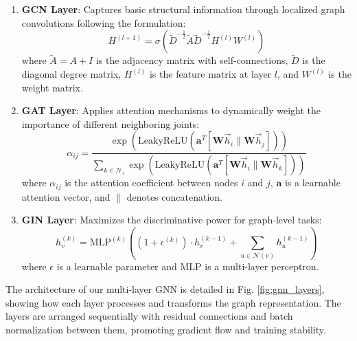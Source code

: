 \documentclass[conference]{IEEEtran}
\begin{document}
\begin{enumerate}
    \item \textbf{GCN Layer}: Captures basic structural information through localized graph convolutions following the formulation:
    \begin{equation}
    H^{(l+1)} = \sigma\left(\tilde{D}^{-\frac{1}{2}}\tilde{A}\tilde{D}^{-\frac{1}{2}}H^{(l)}W^{(l)}\right)
    \end{equation}
    where $\tilde{A} = A + I$ is the adjacency matrix with self-connections, $\tilde{D}$ is the diagonal degree matrix, $H^{(l)}$ is the feature matrix at layer $l$, and $W^{(l)}$ is the weight matrix.

    \item \textbf{GAT Layer}: Applies attention mechanisms to dynamically weight the importance of different neighboring joints:
    \begin{equation}
    \alpha_{ij} = \frac{\exp\left(\text{LeakyReLU}\left(\mathbf{a}^T[\mathbf{W}\vec{h}_i \| \mathbf{W}\vec{h}_j]\right)\right)}{\sum_{k \in \mathcal{N}_i} \exp\left(\text{LeakyReLU}\left(\mathbf{a}^T[\mathbf{W}\vec{h}_i \| \mathbf{W}\vec{h}_k]\right)\right)}
    \end{equation}
    where $\alpha_{ij}$ is the attention coefficient between nodes $i$ and $j$, $\mathbf{a}$ is a learnable attention vector, and $\|$ denotes concatenation.

    \item \textbf{GIN Layer}: Maximizes the discriminative power for graph-level tasks:
    \begin{equation}
    h_v^{(k)} = \text{MLP}^{(k)}\left((1+\epsilon^{(k)}) \cdot h_v^{(k-1)} + \sum_{u \in \mathcal{N}(v)} h_u^{(k-1)}\right)
    \end{equation}
    where $\epsilon$ is a learnable parameter and MLP is a multi-layer perceptron.
\end{enumerate}

The architecture of our multi-layer GNN is detailed in Fig. \ref{fig:gnn_layers}, showing how each layer processes and transforms the graph representation. The layers are arranged sequentially with residual connections and batch normalization between them, promoting gradient flow and training stability.
\end{document}

